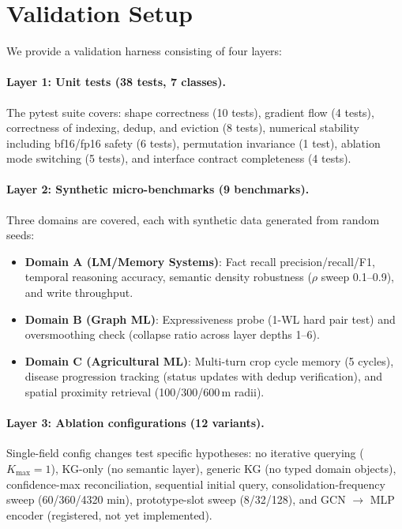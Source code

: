 \documentclass{article}
\begin{document}
\section{Validation Setup}
\label{sec:valid}

We provide a validation harness consisting of four layers:

\paragraph{Layer 1: Unit tests (38 tests, 7 classes).}
The pytest suite covers: shape correctness (10 tests), gradient flow (4 tests),
correctness of indexing, dedup, and eviction (8 tests), numerical stability
including bf16/fp16 safety (6 tests), permutation invariance (1 test), ablation
mode switching (5 tests), and interface contract completeness (4 tests).

\paragraph{Layer 2: Synthetic micro-benchmarks (9 benchmarks).}
Three domains are covered, each with synthetic data generated from random seeds:

\begin{itemize}
  \item \textbf{Domain A (LM/Memory Systems)}: Fact recall precision/recall/F1,
        temporal reasoning accuracy, semantic density robustness ($\rho$ sweep
        0.1--0.9), and write throughput.
  \item \textbf{Domain B (Graph ML)}: Expressiveness probe (1-WL hard pair test)
        and oversmoothing check (collapse ratio across layer depths 1--6).
  \item \textbf{Domain C (Agricultural ML)}: Multi-turn crop cycle memory (5 cycles),
        disease progression tracking (status updates with dedup verification), and
        spatial proximity retrieval (100/300/600\,m radii).
\end{itemize}

\paragraph{Layer 3: Ablation configurations (12 variants).}
Single-field config changes test specific hypotheses: no iterative querying
($K_{\max}=1$), KG-only (no semantic layer), generic KG (no typed domain objects),
confidence-max reconciliation, sequential initial query, consolidation-frequency
sweep (60/360/4320 min), prototype-slot sweep (8/32/128), and GCN $\to$ MLP
encoder (registered, not yet implemented).
\end{document}
